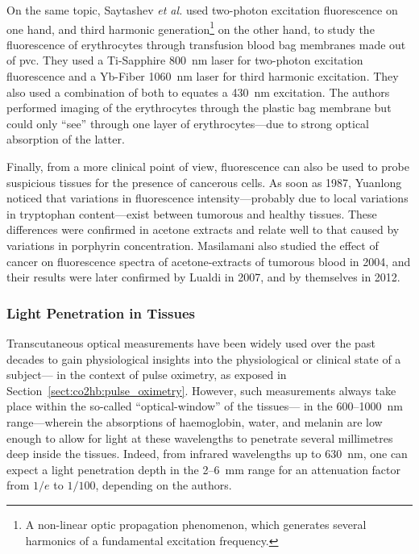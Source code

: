 On the same topic, Saytashev \textit{et al.}\cite{saytashev2016} used two-photon excitation fluorescence on one hand, and third harmonic generation\footnote{A non-linear optic propagation phenomenon, which generates several harmonics of a fundamental excitation frequency.} on the other hand, to study the fluorescence of erythrocytes through transfusion blood bag membranes made out of \gls{pvc}. They used a Ti-Sapphire 800~nm laser for two-photon excitation fluorescence and a Yb-Fiber 1060~nm laser for third harmonic excitation. They also used a combination of both to equates a 430~nm excitation. The authors performed imaging of the erythrocytes through the plastic bag membrane but could only \enquote{see} through one layer of erythrocytes---due to strong optical absorption of the latter.

Finally, from a more clinical point of view, fluorescence can also be used to probe suspicious tissues for the presence of cancerous cells. As soon as 1987, Yuanlong \etal{}\cite{yuanlong1987} noticed that variations in fluorescence intensity---probably due to local variations in tryptophan content---exist between tumorous and healthy tissues. These differences were confirmed in acetone extracts and relate well to that caused by variations in porphyrin concentration. Masilamani \etal{} also studied the effect of cancer on fluorescence spectra of acetone-extracts of tumorous blood in 2004\cite{masilamani2004}, and their results were later confirmed by Lualdi \etal{} in 2007\cite{lualdi2007}, and by themselves in 2012\cite{masilamani2012}.


\subsubsection{Light Penetration in Tissues}\label{sect:co2hb:light_pene}

Transcutaneous optical measurements have been widely used over the past decades to gain physiological insights into the physiological or clinical state of a subject---\eg{} in the context of pulse oximetry, as exposed in Section~\ref{sect:co2hb:pulse_oximetry}. However, such measurements always take place within the so-called \enquote{optical-window} of the tissues---\ie{} in the 600--1000~nm range---wherein the absorptions of haemoglobin, water, and melanin are low enough to allow for light at these wavelengths to penetrate several millimetres deep inside the tissues. Indeed, from infrared wavelengths up to 630~nm, one can expect a light penetration depth in the 2--6~mm range for an attenuation factor from $1/e$ to $1/100$, depending on the authors\cite{wilson1985, melo2001, ash2017}.

